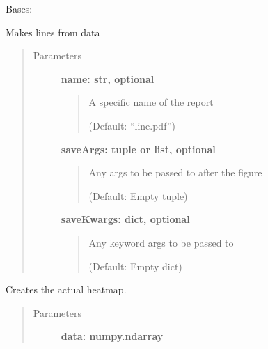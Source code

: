 \documentclass[letterpaper,10pt,english]{sphinxmanual}
\begin{document}

\begin{fulllineitems}
\label{fseq.reporting:fseq.reporting.reports.LinePlot}
Bases: {\hyperref[fseq.reporting:fseq.reporting.reports.ReportBase]{}}

Makes lines from data
\begin{quote}\begin{description}
\item[{Parameters}] \leavevmode
\textbf{name: str, optional}
\begin{quote}

A specific name of the report

(Default: ``line.pdf'')
\end{quote}

\textbf{saveArgs: tuple or list, optional}
\begin{quote}

Any args to be passed to  after the figure

(Default: Empty tuple)
\end{quote}

\textbf{saveKwargs: dict, optional}
\begin{quote}

Any keyword args to be passed to 

(Default: Empty dict)
\end{quote}

\end{description}\end{quote}

\begin{fulllineitems}
\label{fseq.reporting:fseq.reporting.reports.LinePlot.distill}
Creates the actual heatmap.
\begin{quote}\begin{description}
\item[{Parameters}] \leavevmode
\textbf{data: numpy.ndarray}
\begin{quote}


\end{quote}
\end{description}
\end{quote}
\end{fulllineitems}
\end{fulllineitems}
\end{document}
